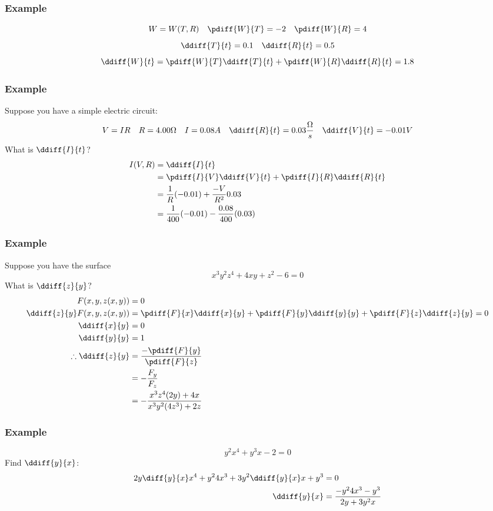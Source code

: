 \documentclass{math}
\begin{document}
\subsubsection*{Example}
\[ W = W(T,R) \quad \pdiff{W}{T} = -2 \quad \pdiff{W}{R} = 4 \]
\[ \ddiff{T}{t} = 0.1 \quad \ddiff{R}{t} = 0.5 \]
\[ \ddiff{W}{t} = \pdiff{W}{T}\ddiff{T}{t}+\pdiff{W}{R}\ddiff{R}{t} = 1.8 \]

\subsubsection*{Example}
Suppose you have a simple electric circuit:
\[ V = IR \quad R = 4.00\Omega \quad I = 0.08A \quad
  \ddiff{R}{t} = 0.03\frac{\Omega}{s} \quad \ddiff{V}{t} = -0.01V \]
What is \( \ddiff{I}{t} \)?
\begin{align*}
  I(V,R) &= \ddiff{I}{t} \\
  &= \pdiff{I}{V}\ddiff{V}{t}+\pdiff{I}{R}\ddiff{R}{t} \\
  &= \frac{1}{R}(-0.01)+\frac{-V}{R^2}{0.03} \\
  &= \frac{1}{400}(-0.01)-\frac{0.08}{400}(0.03)
\end{align*}

\subsubsection*{Example}
Suppose you have the surface
\[ x^3y^2z^4+4xy+z^2-6 = 0 \]
What is \( \ddiff{z}{y} \)?
\begin{align*}
  F(x,y,z(x,y)) &= 0 \\
  \ddiff{z}{y}F(x,y,z(x,y)) &=
    \pdiff{F}{x}\ddiff{x}{y}+\pdiff{F}{y}\ddiff{y}{y}+
    \pdiff{F}{z}\ddiff{z}{y} = 0 \\
  \ddiff{x}{y} &= 0 \\
  \ddiff{y}{y} &= 1\\
  \therefore \ddiff{z}{y} &= \frac{-\pdiff{F}{y}}{\pdiff{F}{z}} \\
  &= -\frac{F_y}{F_z} \\
  &= -\frac{x^3z^4(2y)+4x}{x^3y^2(4z^3)+2z}
\end{align*}

\subsubsection*{Example}
\[ y^2x^4+y^3x-2 = 0 \]
Find \( \ddiff{y}{x} \):
\begin{align*}
  2y\diff{y}{x}x^4+y^{2}4x^3+3y^2\ddiff{y}{x}x+y^3 &= 0 \\
  \ddiff{y}{x} &= \frac{-y^{2}4x^3-y^3}{2y+3y^{2}x}
\end{align*}
\end{document}
